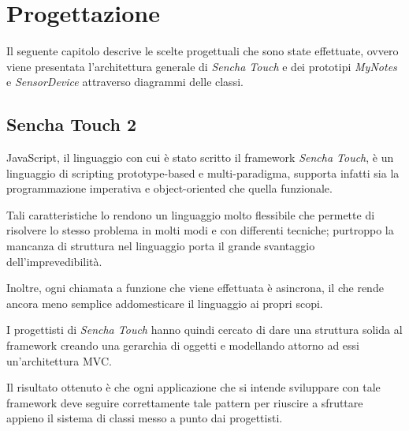 \chapter{Progettazione}\label{ch:progettazione}
Il seguente capitolo descrive le scelte progettuali che sono state effettuate, ovvero viene presentata l'architettura generale di \emph{Sencha Touch} e dei prototipi \emph{MyNotes} e \emph{SensorDevice} attraverso diagrammi delle classi.

\section{Sencha Touch 2}
JavaScript, il linguaggio con cui è stato scritto il framework \emph{Sencha Touch}, è un linguaggio di scripting prototype-based e multi-paradigma, supporta infatti sia la programmazione imperativa e object-oriented che quella funzionale.

Tali caratteristiche lo rendono un linguaggio molto flessibile che permette di risolvere lo stesso problema in molti modi e con differenti tecniche; purtroppo la mancanza di struttura nel linguaggio porta il grande svantaggio dell'imprevedibilità.

Inoltre, ogni chiamata a funzione che viene effettuata è asincrona, il che rende ancora meno semplice addomesticare il linguaggio ai propri scopi.

I progettisti di \emph{Sencha Touch} hanno quindi cercato di dare una struttura solida al framework creando una gerarchia di oggetti e modellando attorno ad essi un'architettura \ac{MVC}.

Il risultato ottenuto è che ogni applicazione che si intende sviluppare con tale framework deve seguire correttamente tale pattern per riuscire a sfruttare appieno il sistema di classi messo a punto dai progettisti.

